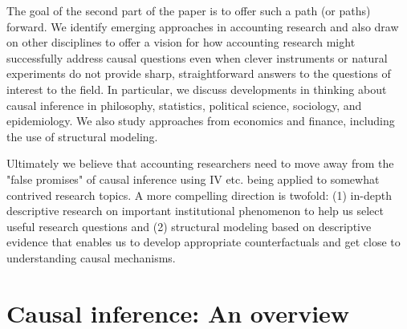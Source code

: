 \documentclass[11pt]{amsart}
\begin{document}
The goal of the second part of the paper is to offer such a path (or paths) forward. 
We identify emerging approaches in accounting research and also draw on other disciplines to offer a vision for how accounting research might successfully address causal questions even when clever instruments or natural experiments do not provide sharp, straightforward answers to the questions of interest to the field.
In particular, we discuss developments in thinking about causal inference in philosophy, statistics, political science, sociology, and epidemiology.
We also study approaches from economics and finance, including the  use of structural modeling.



Ultimately we believe that accounting researchers need to move away from the "false promises" of causal inference using IV etc. being applied to somewhat contrived research topics.  A more compelling direction is twofold:  (1) in-depth descriptive research on important institutional phenomenon to help us select useful research questions and (2) structural modeling  based on descriptive evidence that enables us to develop appropriate counterfactuals and get close to understanding causal mechanisms.    %

\section{Causal inference: An overview}

%
\end{document}
